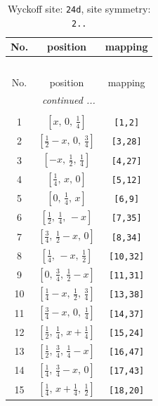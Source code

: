 \documentclass[fleqn,8pt]{jsarticle}
\begin{document}
\renewcommand{\arraystretch}{1.2}
\begin{longtable}{ccc}
\caption{Wyckoff site: {\tt 24d}, site symmetry: {\tt 2..}}
 \\
 \hline \hline
No. & position & mapping \\ \hline \endfirsthead

\multicolumn{2}{l}{\tablename\ \thetable{}} \\
 \hline \hline
No. & position & mapping \\ \hline \endhead

 \hline \hline
\multicolumn{2}{r}{\footnotesize\it continued ...} \\ \endfoot

 \hline \hline
\multicolumn{2}{r}{} \\ \endlastfoot

1 & $\left[ x,\, 0,\, \frac{1}{4} \right]$ & {\tt [1,2]} \\ \hline
2 & $\left[ \frac{1}{2} - x,\, 0,\, \frac{3}{4} \right]$ & {\tt [3,28]} \\ \hline
3 & $\left[ - x,\, \frac{1}{2},\, \frac{1}{4} \right]$ & {\tt [4,27]} \\ \hline
4 & $\left[ \frac{1}{4},\, x,\, 0 \right]$ & {\tt [5,12]} \\ \hline
5 & $\left[ 0,\, \frac{1}{4},\, x \right]$ & {\tt [6,9]} \\ \hline
6 & $\left[ \frac{1}{2},\, \frac{1}{4},\, - x \right]$ & {\tt [7,35]} \\ \hline
7 & $\left[ \frac{3}{4},\, \frac{1}{2} - x,\, 0 \right]$ & {\tt [8,34]} \\ \hline
8 & $\left[ \frac{1}{4},\, - x,\, \frac{1}{2} \right]$ & {\tt [10,32]} \\ \hline
9 & $\left[ 0,\, \frac{3}{4},\, \frac{1}{2} - x \right]$ & {\tt [11,31]} \\ \hline
10 & $\left[ \frac{1}{4} - x,\, \frac{1}{2},\, \frac{3}{4} \right]$ & {\tt [13,38]} \\ \hline
11 & $\left[ \frac{3}{4} - x,\, 0,\, \frac{1}{4} \right]$ & {\tt [14,37]} \\ \hline
12 & $\left[ \frac{1}{2},\, \frac{1}{4},\, x + \frac{1}{4} \right]$ & {\tt [15,24]} \\ \hline
13 & $\left[ \frac{1}{2},\, \frac{3}{4},\, \frac{1}{4} - x \right]$ & {\tt [16,47]} \\ \hline
14 & $\left[ \frac{1}{4},\, \frac{3}{4} - x,\, 0 \right]$ & {\tt [17,43]} \\ \hline
15 & $\left[ \frac{1}{4},\, x + \frac{1}{4},\, \frac{1}{2} \right]$ & {\tt [18,20]} \\ \hline

\end{longtable}
\end{document}

